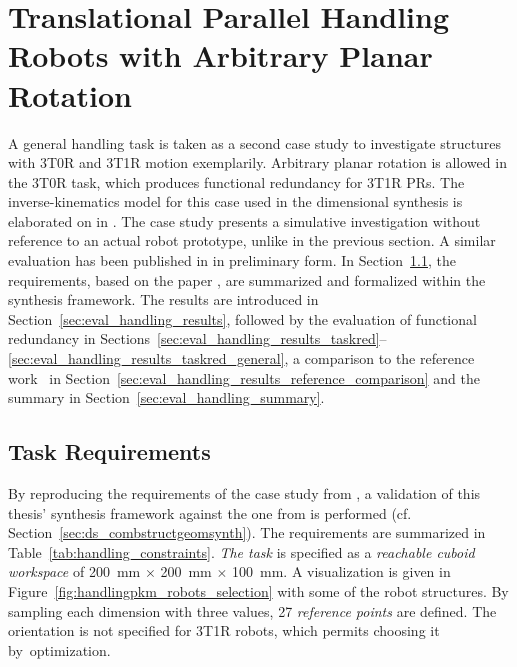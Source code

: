 %
%
%

\section{Translational Parallel Handling Robots with Arbitrary Planar Rotation}
\label{sec:eval_handlingfreerotation}


%
%
%
%
%
%
%
%

A general handling task is taken as a second case study to investigate structures with 3T0R and 3T1R motion exemplarily.
Arbitrary planar rotation is allowed in the 3T0R task, which produces functional redundancy for 3T1R PRs.
The inverse-kinematics model for this case used in the dimensional synthesis is elaborated on in \cite{Schappler2022_ARK3T1R}.
The case study presents a simulative investigation without reference to an actual robot prototype, unlike in the previous section.
A similar evaluation has been published in \cite{Schappler2022_ARK3T1R} in preliminary form.
In Section~\ref{sec:eval_handling_task}, the requirements, based on the paper \cite{PrauseChaCor2015}, are summarized and formalized within the synthesis framework.
The results are introduced in Section~\ref{sec:eval_handling_results}, followed by the evaluation of functional redundancy in Sections~\ref{sec:eval_handling_results_taskred}--\ref{sec:eval_handling_results_taskred_general}, a comparison to the reference work~\cite{PrauseChaCor2015} in Section~\ref{sec:eval_handling_results_reference_comparison} and the summary in Section~\ref{sec:eval_handling_summary}. %
%


%
%
%
%
%
%
%
%
%


\subsection{Task Requirements}
\label{sec:eval_handling_task}


%
%
%
%
%
%
%
%
%

By reproducing the requirements of the case study from \cite{PrauseChaCor2015}, a validation of this thesis' synthesis framework against the one from \cite{Prause2016} is performed (cf. Section~\ref{sec:ds_combstructgeomsynth}).
The requirements are summarized in Table~\ref{tab:handling_constraints}.
\emph{The task} is specified as a \emph{reachable cuboid workspace} of \SI{200}{\milli\metre} $\times$ \SI{200}{\milli\metre} $\times$ \SI{100}{\milli\metre}.
A visualization is given in Figure~\ref{fig:handlingpkm_robots_selection} with some of the robot structures.
By sampling each dimension with three values, 27 \emph{reference points} are defined. 
The orientation is not specified for 3T1R robots, which permits choosing it by~optimization.

